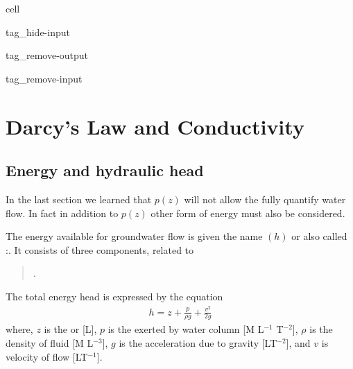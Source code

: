 \documentclass[letterpaper,10pt,english]{jupyterBook}
\begin{document}
\begin{sphinxuseclass}{cell}
\begin{sphinxuseclass}{tag_hide-input}
\begin{sphinxuseclass}{tag_remove-output}
\begin{sphinxuseclass}{tag_remove-input}
\end{sphinxuseclass}
\end{sphinxuseclass}
\end{sphinxuseclass}
\end{sphinxuseclass}

\chapter{Darcy’s Law and Conductivity}
\label{\detokenize{content/flow/L4/14_darcy_law_K:darcy-s-law-and-conductivity}}\label{\detokenize{content/flow/L4/14_darcy_law_K::doc}}
\sphinxAtStartPar
{}


\section{Energy and hydraulic head}
\label{\detokenize{content/flow/L4/14_darcy_law_K:energy-and-hydraulic-head}}
\sphinxAtStartPar
In the last section we learned that  \(p(z)\) will not allow the fully quantify water flow. In fact in addition to \(p(z)\) other form of energy must also be considered.

\sphinxAtStartPar
The energy available for groundwater flow is given the name  \((h)\) or also called :. It consists of three components, related to
\begin{quote}

\sphinxAtStartPar
{}.
\end{quote}

\sphinxAtStartPar
The total energy head is expressed by the equation
\begin{equation*}
\begin{split}
h = z + \frac{p}{\rho g} + \frac{v^2}{2g}
\end{split}
\end{equation*}
\sphinxAtStartPar
where, 
\(z\) is the  or  {[}L{]}, 
\(p\) is the 
exerted by water column {[}M L\(^{-1}\) T\(^{-2}\){]},
\(\rho\) is the density of fluid {[}M L\(^{-3}\){]},
\(g\) is the acceleration due to gravity {[}LT\(^{-2}\){]}, and 
\(v\) is velocity of flow {[}LT\(^{-1}\){]}.
\end{document}

